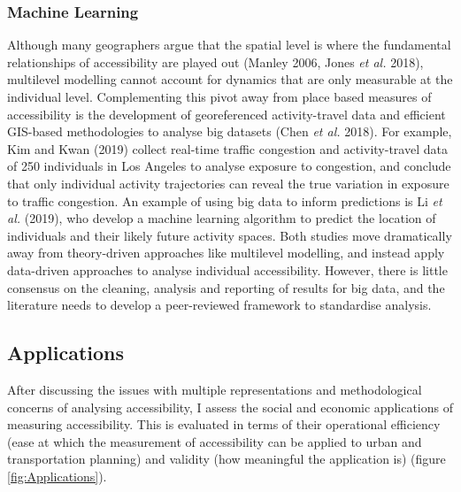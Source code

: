 \documentclass[a4paper,UKenglish]{lipics-v2018}
\begin{document}
\subsubsection{Machine Learning}
Although many geographers argue that the spatial level is where the fundamental relationships of accessibility are played out (Manley 2006, Jones \textit{et al.} 2018), multilevel modelling cannot account for dynamics that are only measurable at the individual level. Complementing this pivot away from place based measures of accessibility is the development of georeferenced activity-travel data and efficient GIS-based methodologies to analyse big datasets (Chen \textit{et al.} 2018). For example, Kim and Kwan (2019) collect real-time traffic congestion and activity-travel data of 250 individuals in Los Angeles to analyse exposure to congestion, and conclude that only individual activity trajectories can reveal the true variation in exposure to traffic congestion. An example of using big data to inform predictions is Li \textit{et al.} (2019), who develop a machine learning algorithm to predict the location of individuals and their likely future activity spaces. Both studies move dramatically away from theory-driven approaches like multilevel modelling, and instead apply data-driven approaches to analyse individual accessibility. However, there is little consensus on the cleaning, analysis and reporting of results for big data, and the literature needs to develop a peer-reviewed framework to standardise analysis.

\subsection{Applications}
After discussing the issues with multiple representations and methodological concerns of analysing accessibility, I assess the social and economic applications of measuring accessibility. This is evaluated in terms of their operational efficiency (ease at which the measurement of accessibility can be applied to urban and transportation planning) and validity (how meaningful the application is) (figure \ref{fig:Applications}).
\end{document}

